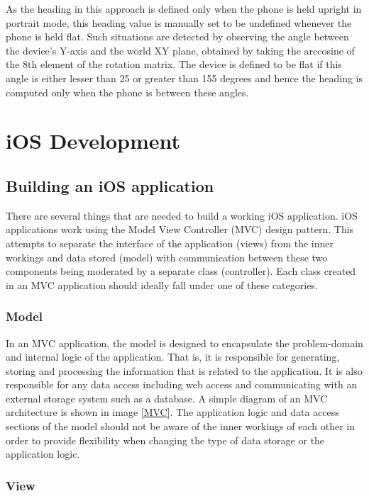 \documentclass[12pt,a4paper]{report}
\begin{document}
As the heading in this approach is defined only when the phone is held upright in portrait mode, this heading value is manually set to be undefined whenever the phone is held flat. Such situations are detected by observing the angle between the device's Y-axis and the world XY plane, obtained by taking the arccosine of the 8th element of the rotation matrix. The device is defined to be flat if this angle is either lesser than 25 or greater than 155 degrees and hence the heading is computed only when the phone is between these angles.


\section{iOS Development}


\subsection{Building an iOS application}

There are several things that are needed to build a working iOS application. iOS applications work using the Model View Controller (MVC) design pattern. This attempts to separate the interface of the application (views) from the inner workings and data stored (model) with communication between these two components being moderated by a separate class (controller). Each class created in an MVC application should ideally fall under one of these categories. 

\subsubsection{Model}

In an MVC application, the model is designed to encapsulate the problem-domain and internal logic of the application. That is, it is responsible for generating, storing and processing the information that is related to the application. It is also responsible for any data access including web access and communicating with an external storage system such as a database. A simple diagram of an MVC architecture is shown in image \ref{MVC}. The application logic and data access sections of the model should not be aware of the inner workings of each other in order to provide flexibility when changing the type of data storage or the application logic. 

\subsubsection{View}
\end{document}
